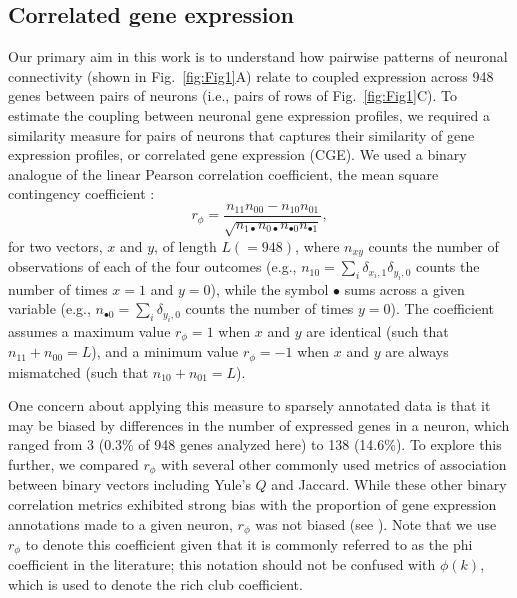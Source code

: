 \documentclass[10pt,letterpaper]{article}
\begin{document}
\subsection*{Correlated gene expression}
Our primary aim in this work is to understand how pairwise patterns of neuronal connectivity (shown in Fig.~\ref{fig:Fig1}A) relate to coupled expression across 948 genes between pairs of neurons (i.e., pairs of rows of Fig.~\ref{fig:Fig1}C).
To estimate the coupling between neuronal gene expression profiles, we required a similarity measure for pairs of neurons that captures their similarity of gene expression profiles, or correlated gene expression (CGE).
We used a binary analogue of the linear Pearson correlation coefficient, the mean square contingency coefficient \cite{Warrens2008}:
\begin{equation} \label{eq:rphi}
    r_\phi = \frac{n_{11}n_{00} - n_{10}n_{01}}{\sqrt{n_{1\bullet}n_{0\bullet}n_{\bullet 0}n_{\bullet 1}}},
\end{equation}
for two vectors, $x$ and $y$, of length $L (=948)$, where $n_{xy}$ counts the number of observations of each of the four outcomes (e.g., $n_{10} = \sum_i \delta_{x_i,1}\delta_{y_i,0}$ counts the number of times $x=1$ and $y=0$), while the symbol $\bullet$ sums across a given variable (e.g., $n_{\bullet 0} = \sum_i \delta_{y_i,0}$ counts the number of times $y = 0$).
The coefficient assumes a maximum value $r_\phi = 1$ when $x$ and $y$ are identical (such that $n_{11} + n_{00} = L$), and a minimum value $r_\phi = -1$ when $x$ and $y$ are always mismatched (such that $n_{10} + n_{01} = L$).

One concern about applying this measure to sparsely annotated data is that it may be biased by differences in the number of expressed genes in a neuron, which ranged from 3 (0.3\% of 948 genes analyzed here) to 138 (14.6\%).
To explore this further, we compared $r_\phi$ with several other commonly used metrics of association between binary vectors including Yule's $Q$ and Jaccard.
While these other binary correlation metrics exhibited strong bias with the proportion of gene expression annotations made to a given neuron, $r_\phi$ was not biased (see ).
Note that we use $r_\phi$ to denote this coefficient given that it is commonly referred to as the phi coefficient in the literature; this notation should not be confused with $\phi(k)$, which is used to denote the rich club coefficient.
\end{document}
